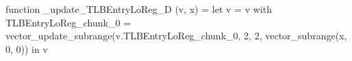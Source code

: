 function _update_TLBEntryLoReg_D (v, x) = let v = { v with TLBEntryLoReg_chunk_0 = vector_update_subrange(v.TLBEntryLoReg_chunk_0, 2, 2, vector_subrange(x, 0, 0)) } in v
